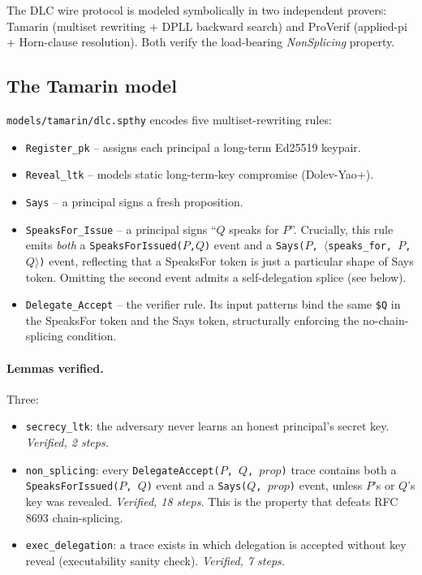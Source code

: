 
The DLC wire protocol is modeled symbolically in two independent
provers: Tamarin (multiset rewriting + DPLL backward search) and
ProVerif (applied-pi + Horn-clause resolution).  Both verify the
load-bearing \emph{NonSplicing} property.

\subsection{The Tamarin model}

\texttt{models/tamarin/dlc.spthy} encodes five multiset-rewriting
rules:

\begin{itemize}
\item \texttt{Register\_pk} -- assigns each principal a long-term Ed25519 keypair.
\item \texttt{Reveal\_ltk} -- models static long-term-key compromise (Dolev-Yao+).
\item \texttt{Says} -- a principal signs a fresh proposition.
\item \texttt{SpeaksFor\_Issue} -- a principal signs ``$Q$ speaks for $P$''.
  Crucially, this rule emits \emph{both} a \texttt{SpeaksForIssued($P$,$Q$)}
  event and a \texttt{Says($P$, $\langle$speaks\_for, $P$, $Q\rangle$)} event,
  reflecting that a SpeaksFor token is just a particular shape of
  Says token.  Omitting the second event admits a self-delegation
  splice (see below).
\item \texttt{Delegate\_Accept} -- the verifier rule.  Its input patterns
  bind the same \texttt{\$Q} in the SpeaksFor token and the Says token,
  structurally enforcing the no-chain-splicing condition.
\end{itemize}

\paragraph{Lemmas verified.}  Three:

\begin{itemize}
\item \texttt{secrecy\_ltk}: the adversary never learns an honest
  principal's secret key.  \emph{Verified, 2 steps.}
\item \texttt{non\_splicing}: every \texttt{DelegateAccept($P$, $Q$, $\mathit{prop}$)}
  trace contains both a \texttt{SpeaksForIssued($P$, $Q$)} event and a
  \texttt{Says($Q$, $\mathit{prop}$)} event, unless $P$'s or $Q$'s key was
  revealed.  \emph{Verified, 18 steps.}  This is the property that
  defeats RFC 8693 chain-splicing.
\item \texttt{exec\_delegation}: a trace exists in which delegation
  is accepted without key reveal (executability sanity check).
  \emph{Verified, 7 steps.}
\end{itemize}

